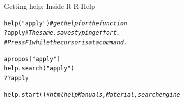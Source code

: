 \documentclass[xcolor=table,           xcolor=dvipsnames]{beamer}\usepackage[]{graphicx}\usepackage[]{color}
\makeatletter
\newcommand{\hlstr}[1]{\textcolor[rgb]{0.545,0.137,0.137}{#1}}
\newcommand{\hlcom}[1]{\textcolor[rgb]{0,0.392,0}{\textit{#1}}}
\newcommand{\hlopt}[1]{\textcolor[rgb]{0,0,0}{#1}}
\newcommand{\hlstd}[1]{\textcolor[rgb]{0,0,0}{#1}}
\newcommand{\hlkwd}[1]{\textcolor[rgb]{0,0,1}{#1}}
\newenvironment{kframe}{%
 \def\at@end@of@kframe{}%
 \ifinner\ifhmode%
  \def\at@end@of@kframe{\end{minipage}}%
  \begin{minipage}{\columnwidth}%
 \fi\fi%
 \def\FrameCommand##1{\hskip\@totalleftmargin \hskip-\fboxsep
 \colorbox{shadecolor}{##1}\hskip-\fboxsep
     \hskip-\linewidth \hskip-\@totalleftmargin \hskip\columnwidth}%
 \MakeFramed {\advance\hsize-\width
   \@totalleftmargin\z@ \linewidth\hsize
   \@setminipage}}%
 {\par\unskip\endMakeFramed%
 \at@end@of@kframe}
\newenvironment{knitrout}{}{} %
\makeatother
\begin{document}
\begin{frame}[fragile]{Getting help: Inside R}
  R-Help
\begin{knitrout}
\color{fgcolor}\begin{kframe}
\begin{alltt}
\hlkwd{help}\hlstd{(}\hlstr{"apply"}\hlstd{)} \hlcom{# get help for the function}
\hlopt{?}\hlstd{apply} \hlcom{# The same. saves typing effort.}
\hlcom{# Press F1 while the cursor is at a command.}

\hlkwd{apropos}\hlstd{(}\hlstr{"apply"}\hlstd{)}
\hlkwd{help.search}\hlstd{(}\hlstr{"apply"}\hlstd{)}
\hlopt{??}\hlstd{apply}

\hlkwd{help.start}\hlstd{()} \hlcom{# html help Manuals, Material, search engine}
\end{alltt}
\end{kframe}
\end{knitrout}
\end{frame}

\end{document}
